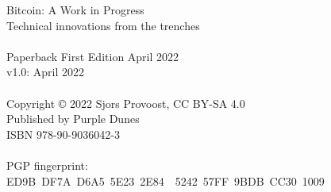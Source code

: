 \newpage
{\setlength{\parindent}{0cm}
\begin{vplace}
Bitcoin: A Work in Progress\\
Technical innovations from the trenches\\
\\
Paperback First Edition April 2022\\
v1.0: April 2022\\
\\
Copyright © 2022 Sjors Provoost, CC BY-SA 4.0\\
Published by Purple Dunes\\
ISBN 978-90-9036042-3\\


\\

PGP fingerprint:\\
ED9B DF7A D6A5 5E23 2E84  5242 57FF 9BDB CC30 1009\\

\end{vplace}
}

